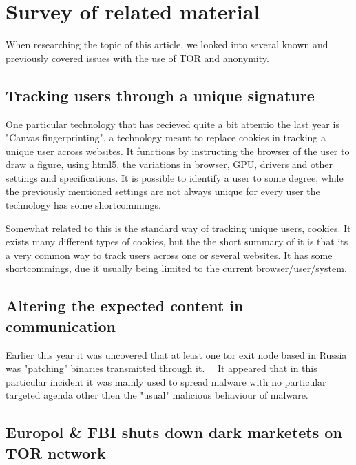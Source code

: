 \section{Survey of related material}
\label{sec:related}
When researching the topic of this article, we looked into several known and previously covered issues with the use of TOR and anonymity.

\subsection{Tracking users through a unique signature}
One particular technology that has recieved quite a bit attentio the last year is "Canvas fingerprinting", a technology meant to replace cookies in tracking a unique user across websites. It functions by instructing the browser of the user to draw a figure, using html5, the variations in browser, GPU, drivers and other settings and specifications. It is possible to identify a user to some degree, while the previously mentioned settings are not always unique for every user the technology has some shortcommings.~\cite{wiki_canvas}

Somewhat related to this is the standard way of tracking unique users, cookies.
It exists many different types of cookies, but the the short summary of it is that its a very common way to track users across one or several websites. It has some shortcommings, due it usually being limited to the current browser/user/system.~\cite{wiki_cookie}

\subsection{Altering the expected content in communication} %
Earlier this year it was uncovered that at least one tor exit node based in Russia was "patching" binaries transmitted through it.~\cite{fsecapt}~\cite{lev_bin_apt}
It appeared that in this particular incident it was mainly used to spread malware with no particular targeted agenda other then the "usual" malicious behaviour of malware.


\subsection{Europol \& FBI shuts down dark marketets on TOR network}

